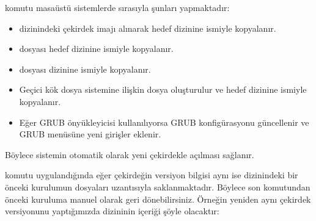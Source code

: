 \documentclass[a4paper,10pt,turkish]{sphinxmanual}
\begin{document}
\sphinxAtStartPar
{} komutu masaüstü sistemlerde sırasıyla şunları yapmaktadır:
\begin{itemize}
\item {} 
\sphinxAtStartPar
{} dizinindeki  çekirdek imajı alınarak hedef  dizinine
 ismiyle kopyalanır.

\item {} 
\sphinxAtStartPar
{} dosyası hedef  dizinine  ismiyle kopyalanır.

\item {} 
\sphinxAtStartPar
{} dosyası  dizinine  ismiyle kopyalanır.

\item {} 
\sphinxAtStartPar
Geçici kök dosya sistemine ilişkin dosya oluşturulur ve hedef  dizinine
 ismiyle kopyalanır.

\item {} 
\sphinxAtStartPar
Eğer GRUB önyükleyicisi kullanılıyorsa GRUB konfigürasyonu güncellenir ve GRUB menüsüne yeni
girişler eklenir.

\end{itemize}

\sphinxAtStartPar
Böylece sistemin otomatik olarak yeni çekirdekle açılması sağlanır.

\sphinxAtStartPar
{} komutu uygulandığında eğer çekirdeğin versiyon bilgisi aynı ise 
dizinindeki bir önceki kurulumun dosyaları  uzantısıyla saklanmaktadır. Böylece son
 komutundan önceki kuruluma manuel olarak geri dönebilirsiniz. Örneğin yeniden
aynı çekirdek versiyonunu  yaptığımızda  dizininin içeriği şöyle
olacaktır:
\end{document}
